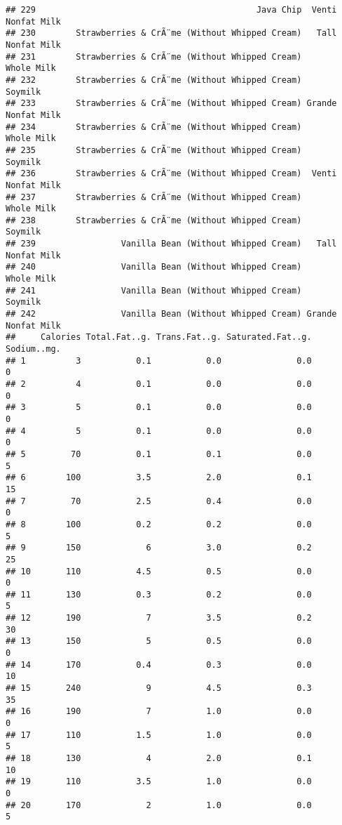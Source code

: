 \documentclass[
]{article}
\begin{document}
\begin{verbatim}
## 229                                            Java Chip  Venti Nonfat Milk
## 230        Strawberries & CrÃ¨me (Without Whipped Cream)   Tall Nonfat Milk
## 231        Strawberries & CrÃ¨me (Without Whipped Cream)         Whole Milk
## 232        Strawberries & CrÃ¨me (Without Whipped Cream)            Soymilk
## 233        Strawberries & CrÃ¨me (Without Whipped Cream) Grande Nonfat Milk
## 234        Strawberries & CrÃ¨me (Without Whipped Cream)         Whole Milk
## 235        Strawberries & CrÃ¨me (Without Whipped Cream)            Soymilk
## 236        Strawberries & CrÃ¨me (Without Whipped Cream)  Venti Nonfat Milk
## 237        Strawberries & CrÃ¨me (Without Whipped Cream)         Whole Milk
## 238        Strawberries & CrÃ¨me (Without Whipped Cream)            Soymilk
## 239                 Vanilla Bean (Without Whipped Cream)   Tall Nonfat Milk
## 240                 Vanilla Bean (Without Whipped Cream)         Whole Milk
## 241                 Vanilla Bean (Without Whipped Cream)            Soymilk
## 242                 Vanilla Bean (Without Whipped Cream) Grande Nonfat Milk
##     Calories Total.Fat..g. Trans.Fat..g. Saturated.Fat..g. Sodium..mg.
## 1          3           0.1           0.0               0.0           0
## 2          4           0.1           0.0               0.0           0
## 3          5           0.1           0.0               0.0           0
## 4          5           0.1           0.0               0.0           0
## 5         70           0.1           0.1               0.0           5
## 6        100           3.5           2.0               0.1          15
## 7         70           2.5           0.4               0.0           0
## 8        100           0.2           0.2               0.0           5
## 9        150             6           3.0               0.2          25
## 10       110           4.5           0.5               0.0           0
## 11       130           0.3           0.2               0.0           5
## 12       190             7           3.5               0.2          30
## 13       150             5           0.5               0.0           0
## 14       170           0.4           0.3               0.0          10
## 15       240             9           4.5               0.3          35
## 16       190             7           1.0               0.0           0
## 17       110           1.5           1.0               0.0           5
## 18       130             4           2.0               0.1          10
## 19       110           3.5           1.0               0.0           0
## 20       170             2           1.0               0.0           5

\end{verbatim}
\end{document}
